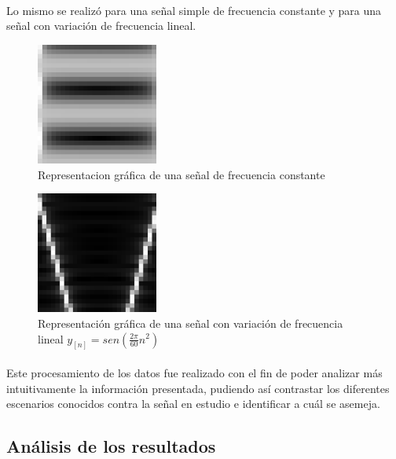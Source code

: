 \documentclass{article}
\begin{document}
	        \paragraph{}
	        Lo mismo se realizó para una señal simple de frecuencia constante y para una señal con variación de frecuencia lineal.
	
	        \begin{figure}[h!]
	            \centering
	            \includegraphics[width=40mm]{constante}
	            \caption{Representacion gráfica de una señal de frecuencia constante}
	            \label{imagen2}
	        \end{figure}
	
	        \begin{figure}[h!]
	            \centering
	            \includegraphics[width=40mm]{variable}
	            \caption{Representación gráfica de una señal con variación de frecuencia lineal $y_{[n]} = sen(\frac{2\pi}{60}n^2)$}
	            \label{imagen3}
	        \end{figure}
	
	        \paragraph{}
	        Este procesamiento de los datos fue realizado con el fin de poder analizar más intuitivamente la información presentada, 
	        pudiendo así contrastar los diferentes escenarios conocidos contra la señal en estudio e identificar a cuál se asemeja.
	\subsection{Análisis de los resultados}
	        
\end{document}
